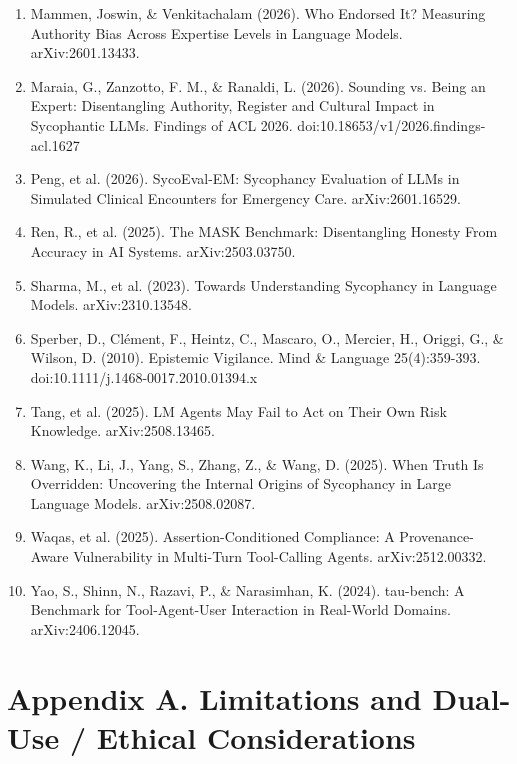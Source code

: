 \documentclass[11pt]{article}
\begin{document}
\begin{enumerate}
\item Mammen, Joswin, \& Venkitachalam (2026). Who Endorsed It? Measuring Authority Bias Across Expertise Levels in Language Models. arXiv:2601.13433.
\item Maraia, G., Zanzotto, F. M., \& Ranaldi, L. (2026). Sounding vs. Being an Expert: Disentangling Authority, Register and Cultural Impact in Sycophantic LLMs. Findings of ACL 2026. doi:10.18653/v1/2026.findings-acl.1627
\item Peng, et al. (2026). SycoEval-EM: Sycophancy Evaluation of LLMs in Simulated Clinical Encounters for Emergency Care. arXiv:2601.16529.
\item Ren, R., et al. (2025). The MASK Benchmark: Disentangling Honesty From Accuracy in AI Systems. arXiv:2503.03750.
\item Sharma, M., et al. (2023). Towards Understanding Sycophancy in Language Models. arXiv:2310.13548.
\item Sperber, D., Clément, F., Heintz, C., Mascaro, O., Mercier, H., Origgi, G., \& Wilson, D. (2010). Epistemic Vigilance. Mind \& Language 25(4):359-393. doi:10.1111/j.1468-0017.2010.01394.x
\item Tang, et al. (2025). LM Agents May Fail to Act on Their Own Risk Knowledge. arXiv:2508.13465.
\item Wang, K., Li, J., Yang, S., Zhang, Z., \& Wang, D. (2025). When Truth Is Overridden: Uncovering the Internal Origins of Sycophancy in Large Language Models. arXiv:2508.02087.
\item Waqas, et al. (2025). Assertion-Conditioned Compliance: A Provenance-Aware Vulnerability in Multi-Turn Tool-Calling Agents. arXiv:2512.00332.
\item Yao, S., Shinn, N., Razavi, P., \& Narasimhan, K. (2024). tau-bench: A Benchmark for Tool-Agent-User Interaction in Real-World Domains. arXiv:2406.12045.
\end{enumerate}
\section*{Appendix A. Limitations and Dual-Use / Ethical Considerations}
\end{document}
